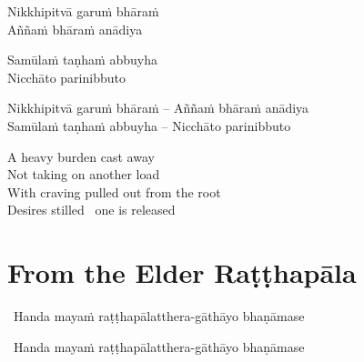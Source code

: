 \ifninebythirteen

\begin{pali-hang-verses}
  Nikkhipitvā garuṁ bhāraṁ\\
  Aññaṁ bhāraṁ anādiya
\end{pali-hang-verses}
\begin{pali-hang-together}
  Samūlaṁ taṇhaṁ abbuyha\\
  Nicchāto parinibbuto
\end{pali-hang-together}

\else

\begin{verses}
  Nikkhipitvā garuṁ bhāraṁ – Aññaṁ bhāraṁ anādiya\\
  Samūlaṁ taṇhaṁ abbuyha – Nicchāto parinibbuto
\end{verses}

\fi

\begin{english-verses}
  A heavy burden cast away\\
  Not taking on another load\\
  With craving pulled out from the root\\
  Desires stilled \breathmark\ one is released
\end{english-verses}

\suttaRef{[SN 22.22]}

\ifdigital{}\fi



\section{From the Elder Raṭṭhapāla}
\label{ratthapala}

\ifninebythirteen

\begin{leader}
  \anglebracketleft\ \hspace{-0.5mm}Handa mayaṁ raṭṭhapālatthera-gāthāyo \mbox{bhaṇāmase}~\hspace{-0.5mm}\anglebracketright\
\end{leader}

\else 

\begin{leader}
  \anglebracketleft\ \hspace{-0.5mm}Handa mayaṁ raṭṭhapālatthera-gāthāyo bhaṇāmase \hspace{-0.5mm}\anglebracketright\
\end{leader}

